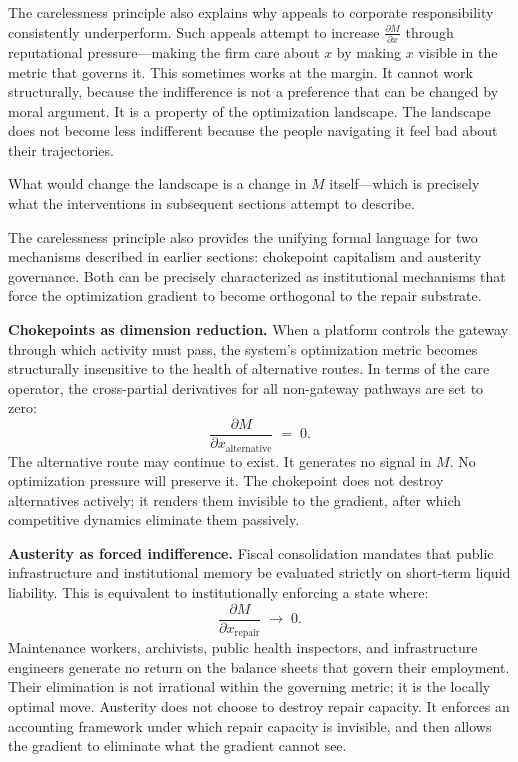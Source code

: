 \documentclass[11pt, letterpaper]{article}
\begin{document}
The carelessness principle also explains why appeals to corporate responsibility consistently underperform. Such appeals attempt to increase $\frac{\partial M}{\partial x}$ through reputational pressure---making the firm care about $x$ by making $x$ visible in the metric that governs it. This sometimes works at the margin. It cannot work structurally, because the indifference is not a preference that can be changed by moral argument. It is a property of the optimization landscape. The landscape does not become less indifferent because the people navigating it feel bad about their trajectories.

What would change the landscape is a change in $M$ itself---which is precisely what the interventions in subsequent sections attempt to describe.

The carelessness principle also provides the unifying formal language for two mechanisms described in earlier sections: chokepoint capitalism and austerity governance. Both can be precisely characterized as institutional mechanisms that force the optimization gradient to become orthogonal to the repair substrate.

\textbf{Chokepoints as dimension reduction.} When a platform controls the gateway through which activity must pass, the system's optimization metric becomes structurally insensitive to the health of alternative routes. In terms of the care operator, the cross-partial derivatives for all non-gateway pathways are set to zero:
\[
  \frac{\partial M}{\partial x_{\text{alternative}}} \;=\; 0.
\]
The alternative route may continue to exist. It generates no signal in $M$. No optimization pressure will preserve it. The chokepoint does not destroy alternatives actively; it renders them invisible to the gradient, after which competitive dynamics eliminate them passively.

\textbf{Austerity as forced indifference.} Fiscal consolidation mandates that public infrastructure and institutional memory be evaluated strictly on short-term liquid liability. This is equivalent to institutionally enforcing a state where:
\[
  \frac{\partial M}{\partial x_{\text{repair}}} \;\to\; 0.
\]
Maintenance workers, archivists, public health inspectors, and infrastructure engineers generate no return on the balance sheets that govern their employment. Their elimination is not irrational within the governing metric; it is the locally optimal move. Austerity does not choose to destroy repair capacity. It enforces an accounting framework under which repair capacity is invisible, and then allows the gradient to eliminate what the gradient cannot see.
\end{document}

